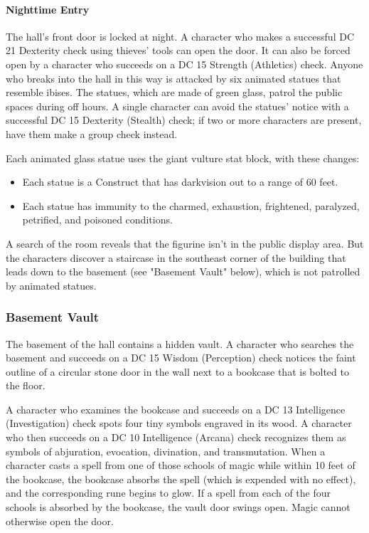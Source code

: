 \documentclass[10pt,a4paper,twoside,twocolumn,openany,nodeprecatedcode]{dndbook}
\begin{document}
\paragraph{Nighttime Entry}
The hall's front door is locked at night. A character who makes a successful DC 21 Dexterity check using thieves' tools can open the door. It can also be forced open by a character who succeeds on a DC 15 Strength (Athletics) check. Anyone who breaks into the hall in this way is attacked by six animated statues that resemble ibises. The statues, which are made of green glass, patrol the public spaces during off hours. A single character can avoid the statues' notice with a successful DC 15 Dexterity (Stealth) check; if two or more characters are present, have them make a group check instead.

Each animated glass statue uses the giant vulture stat block, with these changes:


\begin{itemize}
\item Each statue is a Construct that has darkvision out to a range of 60 feet.
\item Each statue has immunity to the charmed, exhaustion, frightened, paralyzed, petrified, and poisoned conditions.
\end{itemize}

A search of the room reveals that the figurine isn't in the public display area. But the characters discover a staircase in the southeast corner of the building that leads down to the basement (see "Basement Vault" below), which is not patrolled by animated statues.

\subsubsection{Basement Vault}
The basement of the hall contains a hidden vault. A character who searches the basement and succeeds on a DC 15 Wisdom (Perception) check notices the faint outline of a circular stone door in the wall next to a bookcase that is bolted to the floor.

A character who examines the bookcase and succeeds on a DC 13 Intelligence (Investigation) check spots four tiny symbols engraved in its wood. A character who then succeeds on a DC 10 Intelligence (Arcana) check recognizes them as symbols of abjuration, evocation, divination, and transmutation. When a character casts a spell from one of those schools of magic while within 10 feet of the bookcase, the bookcase absorbs the spell (which is expended with no effect), and the corresponding rune begins to glow. If a spell from each of the four schools is absorbed by the bookcase, the vault door swings open. Magic cannot otherwise open the door.
\end{document}
